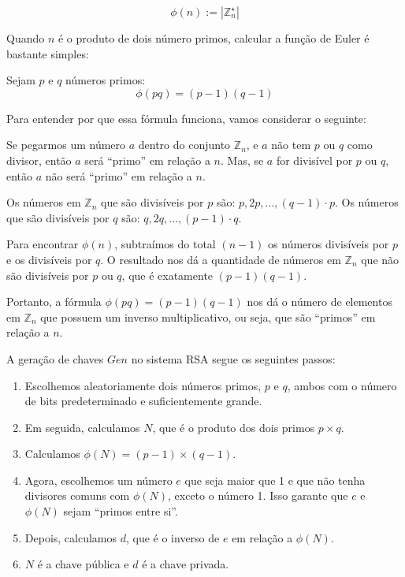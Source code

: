 \begin{displaymath}
  \phi(n) := |\mathbb{Z}_n^\star|
\end{displaymath}

Quando $n$ é o produto de dois número primos, calcular a função de Euler é bastante simples:

\begin{proposition}
Sejam $p$ e $q$ números primos:
\begin{displaymath}
  \phi(pq) = (p - 1)(q - 1)
\end{displaymath}
\end{proposition}

Para entender por que essa fórmula funciona, vamos considerar o seguinte:

Se pegarmos um número $a$ dentro do conjunto $\mathbb{Z}_n$, e $a$ não tem $p$ ou $q$ como divisor, então $a$ será ``primo'' em relação a $n$.
Mas, se $a$ for divisível por $p$ ou $q$, então $a$ não será ``primo'' em relação a $n$.

Os números em $\mathbb{Z}_n$ que são divisíveis por $p$ são: $p, 2p, \dots, (q-1) \cdot p$.
Os números que são divisíveis por $q$ são: $q, 2q, \dots, (p-1) \cdot q$.

Para encontrar $\phi(n)$, subtraímos do total $(n-1)$ os números divisíveis por $p$ e os divisíveis por $q$.
O resultado nos dá a quantidade de números em $\mathbb{Z}_n$ que não são divisíveis por $p$ ou $q$, que é exatamente $(p-1)(q-1)$.

Portanto, a fórmula $\phi(pq) = (p-1)(q-1)$ nos dá o número de elementos em $\mathbb{Z}_n$ que possuem um inverso multiplicativo, ou seja, que são ``primos'' em relação a $n$.

A geração de chaves $Gen$ no sistema RSA segue os seguintes passos:

\begin{enumerate}
\item Escolhemos aleatoriamente dois números primos, $p$ e $q$, ambos com o número de bits predeterminado e suficientemente grande.
    
\item Em seguida, calculamos $N$, que é o produto dos dois primos $p \times q$.
\item Calculamos $\phi(N) = (p - 1) \times (q - 1)$. 
    
\item Agora, escolhemos um número $e$ que seja maior que 1 e que não tenha divisores comuns com $\phi(N)$, exceto o número 1.
  Isso garante que $e$ e $\phi(N)$ sejam ``primos entre si''.
    
\item Depois, calculamos $d$, que é o inverso de $e$ em relação a $\phi(N)$.
\item $N$ é a chave pública e $d$ é a chave privada.
\end{enumerate}

